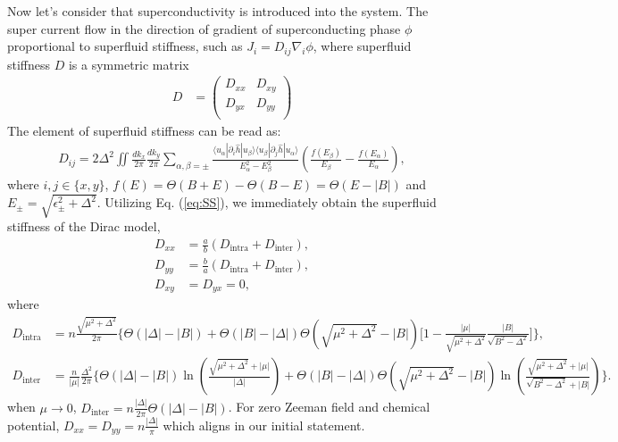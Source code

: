 \documentclass{article}
\begin{document}
Now let's consider that superconductivity is introduced into the system. The super current flow in the direction of gradient of superconducting phase $ \phi $ proportional to superfluid stiffness, such as $ J_{i}=D_{ij}\nabla_i \phi$, where superfluid stiffness $ D $ is a symmetric matrix
\begin{align}
    D & = \left(\begin{array}{cc}
        D_{xx}  & D_{xy}    \\
        D_{yx}  & D_{yy}   \\
    \end{array}\right)
\end{align}
The element of superfluid stiffness can be read as:
\begin{align}
    D_{ij} = 2\Delta^2 \iint \frac{dk_x}{2\pi} \frac{dk_y}{2\pi} \sum_{\alpha,\beta=\pm} \frac{\langle u_{\alpha}|\partial_{i} \hat{h}|u_{\beta}\rangle\langle u_{\beta}|\partial_{j} \hat{h}|u_{\alpha}\rangle}{E_\alpha^2 - E_\beta^2} \left(\frac{f(E_\beta)}{E_\beta} - \frac{f(E_\alpha)}{E_\alpha} \right),\label{eq:SS}
\end{align} 
where $ i,j \in \{x,y\} $, $ f(E) = \Theta(B+E)-\Theta(B-E)=\Theta(E-\left\vert B \right\vert ) $ and $ E_\pm = \sqrt{\epsilon_\pm^2 + \Delta^2}  $. Utilizing Eq. (\ref{eq:SS}), we immediately obtain the superfluid stiffness of the Dirac model,
\begin{align}
    D_{xx}  &=\frac{a}{b} (D_{\textrm{intra}} + D_{\textrm{inter}}),\\ \label{eq:Dxx }
    D_{yy}  &=\frac{b}{a} (D_{\textrm{intra}} + D_{\textrm{inter}}),\\ \label{eq:Dyy }
    D_{xy} &= D_{yx} = 0,
\end{align}
where
\begin{align*}
    D_{\textrm{intra}} &=  n \frac{\sqrt{\mu^2+\Delta^2}}{2\pi}\Bigg\{ \Theta(|\Delta|-|B|)+\Theta(|B|-|\Delta|)\Theta(\sqrt{\mu^2+\Delta^2}-|B|) \bigg[1-\frac{|\mu|}{\sqrt{\mu^2+\Delta^2}}\frac{|B|}{\sqrt{B^2-\Delta^2}}\bigg]\Bigg\},\\
    D_{\textrm{inter}} &= \frac{n}{|\mu|}\frac{\Delta^2}{2\pi} \Bigg\{ \Theta(|\Delta|-|B|)\ln(\frac{\sqrt{\mu^2+\Delta^2}+|\mu|}{|\Delta|})+\Theta(|B|-|\Delta|)\Theta(\sqrt{\mu^2+\Delta^2}-|B|)\ln(\frac{\sqrt{\mu^2+\Delta^2}+|\mu|}{\sqrt{B^2-\Delta^2}+|B|}) \Bigg\}.    
\end{align*}
when $\mu \to 0$, $D_{\textrm{inter}}=n\frac{|\Delta|}{2\pi}\Theta(|\Delta|-|B|) $. For zero Zeeman field and chemical potential, $ D_{xx}=D_{yy} = n \frac{\left\vert \Delta \right\vert}{\pi}     $ which aligns in our initial statement. 
\end{document}
